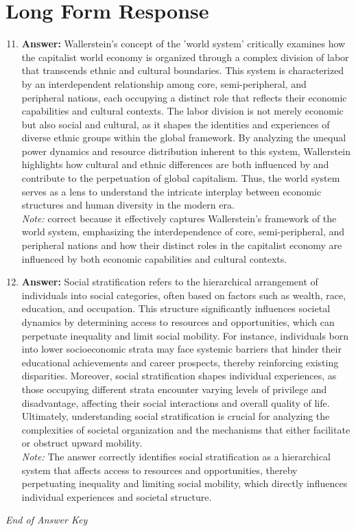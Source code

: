 \documentclass[12pt]{article}
\begin{document}
\section*{Long Form Response}
\begin{enumerate}[label=\arabic*.]
\setcounter{enumi}{10}
\item \textbf{Answer:} Wallerstein's concept of the 'world system' critically examines how the capitalist world economy is organized through a complex division of labor that transcends ethnic and cultural boundaries. This system is characterized by an interdependent relationship among core, semi-peripheral, and peripheral nations, each occupying a distinct role that reflects their economic capabilities and cultural contexts. The labor division is not merely economic but also social and cultural, as it shapes the identities and experiences of diverse ethnic groups within the global framework. By analyzing the unequal power dynamics and resource distribution inherent to this system, Wallerstein highlights how cultural and ethnic differences are both influenced by and contribute to the perpetuation of global capitalism. Thus, the world system serves as a lens to understand the intricate interplay between economic structures and human diversity in the modern era.
\\ \textit{Note:} correct because it effectively captures Wallerstein's framework of the world system, emphasizing the interdependence of core, semi-peripheral, and peripheral nations and how their distinct roles in the capitalist economy are influenced by both economic capabilities and cultural contexts.
\item \textbf{Answer:} Social stratification refers to the hierarchical arrangement of individuals into social categories, often based on factors such as wealth, race, education, and occupation. This structure significantly influences societal dynamics by determining access to resources and opportunities, which can perpetuate inequality and limit social mobility. For instance, individuals born into lower socioeconomic strata may face systemic barriers that hinder their educational achievements and career prospects, thereby reinforcing existing disparities. Moreover, social stratification shapes individual experiences, as those occupying different strata encounter varying levels of privilege and disadvantage, affecting their social interactions and overall quality of life. Ultimately, understanding social stratification is crucial for analyzing the complexities of societal organization and the mechanisms that either facilitate or obstruct upward mobility.
\\ \textit{Note:} The answer correctly identifies social stratification as a hierarchical system that affects access to resources and opportunities, thereby perpetuating inequality and limiting social mobility, which directly influences individual experiences and societal structure.
\end{enumerate}

\vfill
\noindent\textit{End of Answer Key}
\end{document}
